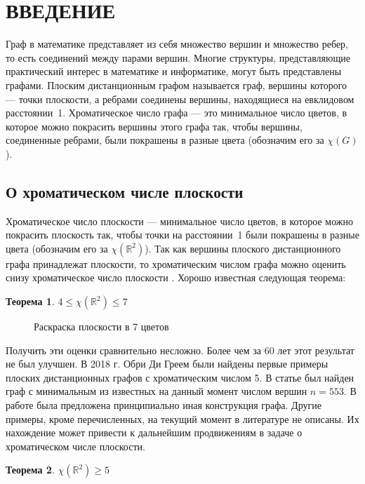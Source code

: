 \documentclass[a4paper,12pt]{article}
\newtheorem{theorem}{Теорема}
\begin{document}
 

\onehalfspacing

\maketitle

\newpage
\pagestyle{plain}
\section{ВВЕДЕНИЕ}
Граф в математике представляет из себя множество вершин и множество ребер, то есть соединений между парами вершин. Многие структуры, представляющие практический интерес в математике и информатике, могут быть представлены графами. Плоским дистанционным графом называется граф, вершины которого --- точки плоскости, а ребрами соединены вершины, находящиеся на евклидовом расстоянии~1. Хроматическое число графа --- это минимальное число цветов, в которое можно покрасить вершины этого графа так, чтобы вершины, соединенные ребрами, были покрашены в разные цвета (обозначим его за $\chi(G)$).
\subsection{О хроматическом числе плоскости}
 Хроматическое число плоскости --- минимальное число цветов, в которое можно покрасить плоскость так, чтобы точки на расстоянии~1 были покрашены в разные цвета (обозначим его за $\chi(\mathbb{R}^2)$). Так как вершины плоского дистанционного графа принадлежат плоскости, то хроматическим числом графа можно оценить снизу хроматическое число плоскости \cite{Rai}. Хорошо известная следующая теорема:
 \begin{theorem} \label{1}
 $4\leq \chi(\mathbb{R}^2)\leq7$
 \end{theorem}
 
  \begin{figure}[h]
    \caption{Раскраска плоскости в 7 цветов}
\end{figure}
 
 Получить эти оценки сравнительно несложно. Более чем за 60 лет этот результат не был улучшен. В 2018 г. Обри Ди Греем\cite{de Grey} были найдены первые примеры плоских дистанционных графов с хроматическим числом 5. В статье \cite{Heule} был найден граф с минимальным из известных на данный момент числом вершин $n = 553$. В работе \cite{Exoo} была предложена принципиально иная конструкция графа. Другие примеры, кроме перечисленных,  на текущий момент в литературе не описаны. Их нахождение может привести к дальнейшим продвижениям в задаче о хроматическом числе плоскости.
 \begin{theorem} \label{2}
 $\chi(\mathbb{R}^2)\geq 5$
 \end{theorem}
 
\end{document}
